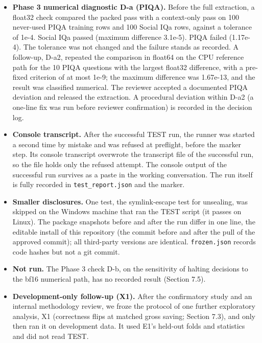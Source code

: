 \begin{itemize}
\tightlist
\item
  \textbf{Phase 3 numerical diagnostic D-a (PIQA).} Before the full extraction, a float32 check compared the packed pass with a context-only pass on 100 never-used PIQA training rows and 100 Social IQa rows, against a tolerance of 1e-4. Social IQa passed (maximum difference 3.1e-5). PIQA failed (1.17e-4). The tolerance was not changed and the failure stands as recorded. A follow-up, D-a2, repeated the comparison in float64 on the CPU reference path for the 10 PIQA questions with the largest float32 difference, with a pre-fixed criterion of at most 1e-9; the maximum difference was 1.67e-13, and the result was classified numerical. The reviewer accepted a documented PIQA deviation and released the extraction. A procedural deviation within D-a2 (a one-line fix was run before reviewer confirmation) is recorded in the decision log.
\item
  \textbf{Console transcript.} After the successful TEST run, the runner was started a second time by mistake and was refused at preflight, before the marker step. Its console transcript overwrote the transcript file of the successful run, so the file holds only the refused attempt. The console output of the successful run survives as a paste in the working conversation. The run itself is fully recorded in \texttt{test\_report.json} and the marker.
\item
  \textbf{Smaller disclosures.} One test, the symlink-escape test for unsealing, was skipped on the Windows machine that ran the TEST script (it passes on Linux). The package snapshots before and after the run differ in one line, the editable install of this repository (the commit before and after the pull of the approved commit); all third-party versions are identical. \texttt{frozen.json} records code hashes but not a git commit.
\item
  \textbf{Not run.} The Phase 3 check D-b, on the sensitivity of halting decisions to the bf16 numerical path, has no recorded result (Section 7.5).
\item
  \textbf{Development-only follow-up (X1).} After the confirmatory study and an internal methodology review, we froze the protocol of one further exploratory analysis, X1 (correctness flips at matched gross saving; Section 7.3), and only then ran it on development data. It used E1's held-out folds and statistics and did not read TEST.
\end{itemize}


